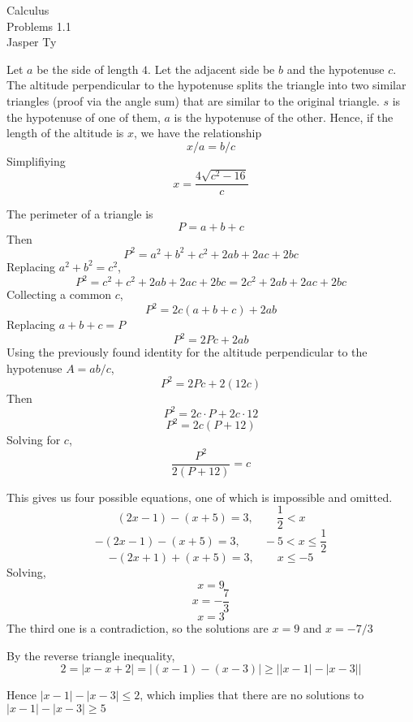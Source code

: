 \documentclass{article}
\begin{document}
\begin{mytitle}
    Calculus \\
    Problems 1.1 \\
    \normalsize Jasper Ty
\end{mytitle}

\begin{Answer}
    Let $a$ be the side of length $4$. Let the adjacent side be $b$ and the hypotenuse $c$.
    The altitude perpendicular to the hypotenuse splits the triangle into two similar triangles (proof via the angle sum) that are similar to the original triangle. $s$ is the hypotenuse of one of them, $a$ is the hypotenuse of the other. Hence, if the length of the altitude is $x$, we have the relationship
    \[x / a = b / c\]
    Simplifiying
    \[x = \frac{4\sqrt{c^2-16}}{c}\]
\end{Answer}

\begin{Answer}
    The perimeter of a triangle is 
    \[P = a + b + c\]
    Then
    \[P^2 = a^2 + b^2 + c^2 + 2ab + 2ac + 2bc\]
    Replacing $a^2 + b^2 = c^2$,
    \[P^2 = c^2 + c^2 + 2ab + 2ac + 2bc = 2c^2 + 2ab + 2ac + 2bc\]
    Collecting a common $c$,
    \[P^2 = 2c(a + b + c) + 2ab\]
    Replacing $a + b + c = P$
    \[P^2 = 2Pc + 2ab\]
    Using the previously found identity for the altitude perpendicular to the hypotenuse $A = ab/c$,
    \[P^2 = 2Pc + 2(12c)\]
    Then 
    \[P^2 = 2c \cdot P + 2c \cdot 12\]
    \[P^2 = 2c(P + 12)\]
    Solving for $c$,
    \[\frac{P^2}{2(P+12)} = c\]
\end{Answer}

\begin{Answer}
    This gives us four possible equations, one of which is impossible and omitted.
    \[(2x - 1) - (x + 5) = 3, \qquad \frac{1}{2} < x\] 
    \[-(2x - 1) - (x + 5) = 3, \qquad -5 < x \leq \frac{1}{2}\]
    \[-(2x + 1) + (x + 5) = 3, \qquad x \leq -5\]
    Solving,
    \[x = 9\]
    \[x = -\frac{7}{3}\]
    \[x = 3\]
    The third one is a contradiction, so the solutions are $x = 9$ and $x = -7/3$
\end{Answer}

\begin{Answer}
    By the reverse triangle inequality,
    \[2 = |x - x + 2| = |(x - 1) - (x - 3)| \geq \bigg| |x-1| - |x-3|\bigg|\]

    Hence $|x-1| - |x-3| \leq 2$, which implies that there are no solutions to $|x-1| - |x-3| \geq 5$
\end{Answer}
\end{document}

